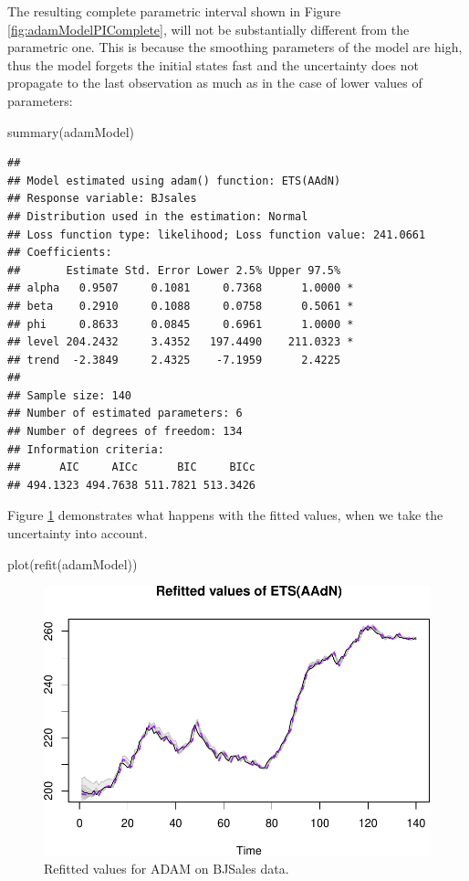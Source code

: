 \documentclass[
]{book}
\newenvironment{Shaded}{\begin{snugshade}}{\end{snugshade}}
\newcommand{\FunctionTok}[1]{\textcolor[rgb]{0.00,0.00,0.00}{#1}}
\newcommand{\NormalTok}[1]{#1}
\theoremstyle{definition}
\theoremstyle{definition}
\theoremstyle{definition}
\theoremstyle{definition}
\theoremstyle{remark}
\begin{document}
The resulting complete parametric interval shown in Figure \ref{fig:adamModelPIComplete}, will not be substantially different from the parametric one. This is because the smoothing parameters of the model are high, thus the model forgets the initial states fast and the uncertainty does not propagate to the last observation as much as in the case of lower values of parameters:

\begin{Shaded}
\begin{Highlighting}[]
\FunctionTok{summary}\NormalTok{(adamModel)}
\end{Highlighting}
\end{Shaded}

\begin{verbatim}
## 
## Model estimated using adam() function: ETS(AAdN)
## Response variable: BJsales
## Distribution used in the estimation: Normal
## Loss function type: likelihood; Loss function value: 241.0661
## Coefficients:
##       Estimate Std. Error Lower 2.5% Upper 97.5%  
## alpha   0.9507     0.1081     0.7368      1.0000 *
## beta    0.2910     0.1088     0.0758      0.5061 *
## phi     0.8633     0.0845     0.6961      1.0000 *
## level 204.2432     3.4352   197.4490    211.0323 *
## trend  -2.3849     2.4325    -7.1959      2.4225  
## 
## Sample size: 140
## Number of estimated parameters: 6
## Number of degrees of freedom: 134
## Information criteria:
##      AIC     AICc      BIC     BICc 
## 494.1323 494.7638 511.7821 513.3426
\end{verbatim}

Figure \ref{fig:adamModelPIRefitted} demonstrates what happens with the fitted values, when we take the uncertainty into account.

\begin{Shaded}
\begin{Highlighting}[]
\FunctionTok{plot}\NormalTok{(}\FunctionTok{refit}\NormalTok{(adamModel))}
\end{Highlighting}
\end{Shaded}

\begin{figure}
\centering
\includegraphics{adam_files/figure-latex/adamModelPIRefitted-1.pdf}
\caption{\label{fig:adamModelPIRefitted}Refitted values for ADAM on BJSales data.}
\end{figure}
\end{document}
